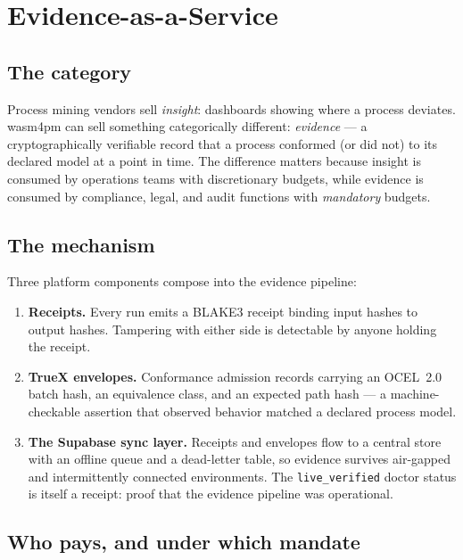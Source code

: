\chapter{Evidence-as-a-Service}
\label{ch:eaas}

\section{The category}

Process mining vendors sell \emph{insight}: dashboards showing where a
process deviates. wasm4pm can sell something categorically different:
\emph{evidence} --- a cryptographically verifiable record that a process
conformed (or did not) to its declared model at a point in time. The
difference matters because insight is consumed by operations teams with
discretionary budgets, while evidence is consumed by compliance, legal, and
audit functions with \emph{mandatory} budgets.

\section{The mechanism}

Three platform components compose into the evidence pipeline:

\begin{enumerate}[leftmargin=2em]
  \item \textbf{Receipts.} Every run emits a BLAKE3 receipt binding input
        hashes to output hashes. Tampering with either side is detectable
        by anyone holding the receipt.
  \item \textbf{TrueX envelopes.} Conformance admission records carrying an
        OCEL~2.0 batch hash, an equivalence class, and an expected path
        hash --- a machine-checkable assertion that observed behavior
        matched a declared process model.
  \item \textbf{The Supabase sync layer.} Receipts and envelopes flow to a
        central store with an offline queue and a dead-letter table, so
        evidence survives air-gapped and intermittently connected
        environments. The \texttt{live\_verified} doctor status is itself a
        receipt: proof that the evidence pipeline was operational.
\end{enumerate}

\section{Who pays, and under which mandate}

